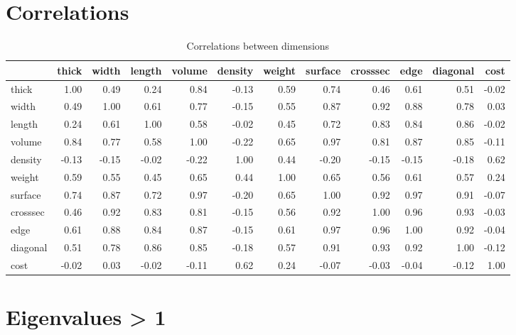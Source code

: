 \documentclass[
]{book}
\begin{document}
\hypertarget{correlations}{%
\section{Correlations}\label{correlations}}

\tiny
\begin{table}

\caption{\label{tab:unnamed-chunk-37}Correlations between dimensions}
\centering
\begin{tabular}[t]{l|r|r|r|r|r|r|r|r|r|r|r}
\hline
  & thick & width & length & volume & density & weight & surface & crosssec & edge & diagonal & cost\\
\hline
thick & 1.00 & 0.49 & 0.24 & 0.84 & -0.13 & 0.59 & 0.74 & 0.46 & 0.61 & 0.51 & -0.02\\
\hline
width & 0.49 & 1.00 & 0.61 & 0.77 & -0.15 & 0.55 & 0.87 & 0.92 & 0.88 & 0.78 & 0.03\\
\hline
length & 0.24 & 0.61 & 1.00 & 0.58 & -0.02 & 0.45 & 0.72 & 0.83 & 0.84 & 0.86 & -0.02\\
\hline
volume & 0.84 & 0.77 & 0.58 & 1.00 & -0.22 & 0.65 & 0.97 & 0.81 & 0.87 & 0.85 & -0.11\\
\hline
density & -0.13 & -0.15 & -0.02 & -0.22 & 1.00 & 0.44 & -0.20 & -0.15 & -0.15 & -0.18 & 0.62\\
\hline
weight & 0.59 & 0.55 & 0.45 & 0.65 & 0.44 & 1.00 & 0.65 & 0.56 & 0.61 & 0.57 & 0.24\\
\hline
surface & 0.74 & 0.87 & 0.72 & 0.97 & -0.20 & 0.65 & 1.00 & 0.92 & 0.97 & 0.91 & -0.07\\
\hline
crosssec & 0.46 & 0.92 & 0.83 & 0.81 & -0.15 & 0.56 & 0.92 & 1.00 & 0.96 & 0.93 & -0.03\\
\hline
edge & 0.61 & 0.88 & 0.84 & 0.87 & -0.15 & 0.61 & 0.97 & 0.96 & 1.00 & 0.92 & -0.04\\
\hline
diagonal & 0.51 & 0.78 & 0.86 & 0.85 & -0.18 & 0.57 & 0.91 & 0.93 & 0.92 & 1.00 & -0.12\\
\hline
cost & -0.02 & 0.03 & -0.02 & -0.11 & 0.62 & 0.24 & -0.07 & -0.03 & -0.04 & -0.12 & 1.00\\
\hline
\end{tabular}
\end{table}

\hypertarget{eigenvalues-1}{%
\section{Eigenvalues \textgreater{} 1}\label{eigenvalues-1}}
\end{document}
